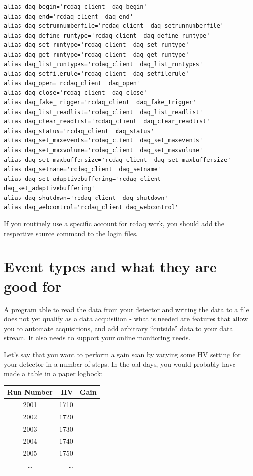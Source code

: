 \documentclass{article}[11pt]
\begin{document}
\begin{verbatim}
alias daq_begin='rcdaq_client  daq_begin'
alias daq_end='rcdaq_client  daq_end'
alias daq_setrunnumberfile='rcdaq_client  daq_setrunnumberfile'
alias daq_define_runtype='rcdaq_client  daq_define_runtype'
alias daq_set_runtype='rcdaq_client  daq_set_runtype'
alias daq_get_runtype='rcdaq_client  daq_get_runtype'
alias daq_list_runtypes='rcdaq_client  daq_list_runtypes'
alias daq_setfilerule='rcdaq_client  daq_setfilerule'
alias daq_open='rcdaq_client  daq_open'
alias daq_close='rcdaq_client  daq_close'
alias daq_fake_trigger='rcdaq_client  daq_fake_trigger'
alias daq_list_readlist='rcdaq_client  daq_list_readlist'
alias daq_clear_readlist='rcdaq_client  daq_clear_readlist'
alias daq_status='rcdaq_client  daq_status'
alias daq_set_maxevents='rcdaq_client  daq_set_maxevents'
alias daq_set_maxvolume='rcdaq_client  daq_set_maxvolume'
alias daq_set_maxbuffersize='rcdaq_client  daq_set_maxbuffersize'
alias daq_setname='rcdaq_client  daq_setname'
alias daq_set_adaptivebuffering='rcdaq_client  daq_set_adaptivebuffering'
alias daq_shutdown='rcdaq_client  daq_shutdown'
alias daq_webcontrol='rcdaq_client daq_webcontrol'
\end{verbatim}

If you routinely use a specific account for rcdaq work, you should add the 
respective source command to the login files.  


\section{Event types and what they are good for}

A program able to read the data from your detector and writing the data
to a file does not yet qualify as a data acquisition - what is needed
are features that allow you to automate acquisitions, and add
arbitrary ``outside'' data to your data stream. It also needs to
support your online monitoring needs.

Let's say that you want to perform a gain scan by varying some HV
setting for your detector in a number of steps. In the old days, you
would probably have made a table in a paper logbook: 

\begin{center}

\begin{tabular}{|c|r|r|}
\hline
Run Number & HV & Gain \\
\hline
\hline
    2001 & 1710 &  \\ \hline
    2002 & 1720 &  \\ \hline
    2003 & 1730 &  \\ \hline
    2004 & 1740 &  \\ \hline
    2005 & 1750 &  \\ \hline
    \dots & \dots &  \\ \hline
\hline
\end{tabular}
\end{center}
\end{document}

